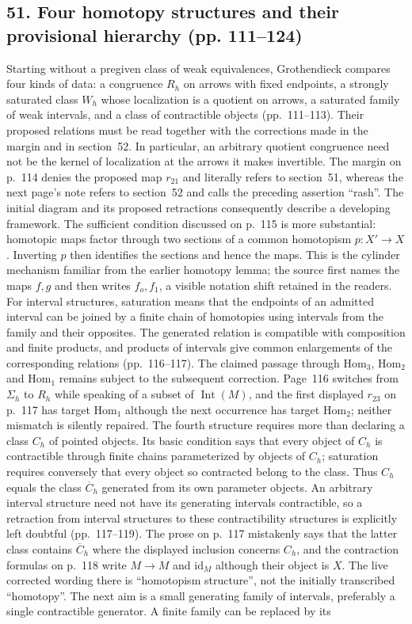 \subsection*{51. Four homotopy structures and their provisional hierarchy (pp. 111--124)}
Starting without a pregiven class of weak equivalences, Grothendieck compares four kinds of data: a congruence $R_h$ on arrows with fixed endpoints, a strongly saturated class $W_h$ whose localization is a quotient on arrows, a saturated family of weak intervals, and a class of contractible objects (pp.~111--113). Their proposed relations must be read together with the corrections made in the margin and in section~52. In particular, an arbitrary quotient congruence need not be the kernel of localization at the arrows it makes invertible. The margin on p.~114 denies the proposed map $r_{21}$ and literally refers to section~51, whereas the next page's note refers to section~52 and calls the preceding assertion ``rash''. The initial diagram and its proposed retractions consequently describe a developing framework. The sufficient condition discussed on p.~115 is more substantial: homotopic maps factor through two sections of a common homotopism $p:X'\to X$. Inverting $p$ then identifies the sections and hence the maps. This is the cylinder mechanism familiar from the earlier homotopy lemma; the source first names the maps $f,g$ and then writes $f_o,f_1$, a visible notation shift retained in the readers. For interval structures, saturation means that the endpoints of an admitted interval can be joined by a finite chain of homotopies using intervals from the family and their opposites. The generated relation is compatible with composition and finite products, and products of intervals give common enlargements of the corresponding relations (pp.~116--117). The claimed passage through $\mathrm{Hom}_3$, $\mathrm{Hom}_2$ and $\mathrm{Hom}_1$ remains subject to the subsequent correction. Page~116 switches from $\Sigma_h$ to $R_h$ while speaking of a subset of $\operatorname{Int}(M)$, and the first displayed $r_{23}$ on p.~117 has target $\mathrm{Hom}_1$ although the next occurrence has target $\mathrm{Hom}_2$; neither mismatch is silently repaired. The fourth structure requires more than declaring a class $C_h$ of pointed objects. Its basic condition says that every object of $C_h$ is contractible through finite chains parameterized by objects of $C_h$; saturation requires conversely that every object so contracted belong to the class. Thus $C_h$ equals the class $\overline C_h$ generated from its own parameter objects. An arbitrary interval structure need not have its generating intervals contractible, so a retraction from interval structures to these contractibility structures is explicitly left doubtful (pp.~117--119). The prose on p.~117 mistakenly says that the latter class contains $\overline C_h$ where the displayed inclusion concerns $C_h$, and the contraction formulas on p.~118 write $M\to M$ and $\mathrm{id}_M$ although their object is $X$. The live corrected wording there is ``homotopism structure'', not the initially transcribed ``homotopy''. The next aim is a small generating family of intervals, preferably a single contractible generator. A finite family can be replaced by its 